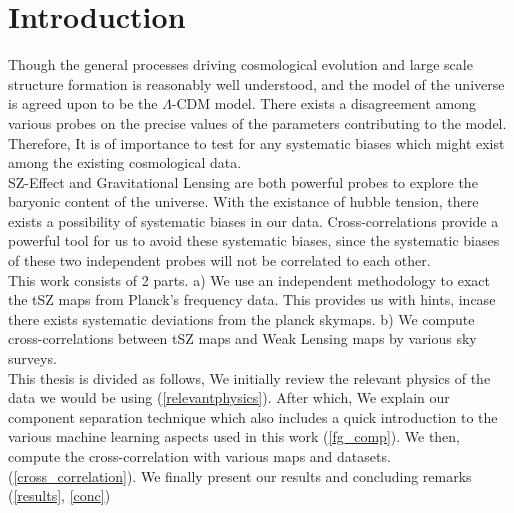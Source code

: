 \chapter{Introduction}
Though the general processes driving cosmological evolution and large scale structure formation is reasonably well understood,
and the model of the universe is agreed upon to be the $\Lambda$-CDM model.
There exists a disagreement among various probes on the precise values of the parameters contributing to the model. 
Therefore, It is of importance to test for any systematic biases which might exist among the existing cosmological data.
\\
SZ-Effect and Gravitational Lensing are both powerful probes to explore the baryonic content of the universe. With the existance of hubble tension, there exists
a possibility of systematic biases in our data. Cross-correlations provide a powerful tool for us to avoid these systematic biases, since the systematic biases
of these two independent probes will not be correlated to each other. 
\\
This work consists of 2 parts. a) We use an independent methodology to exact the tSZ maps from Planck's frequency data. This provides us with hints, incase
there exists systematic deviations from the planck skymaps. b) We compute cross-correlations between tSZ maps and Weak Lensing maps by various sky surveys.
\\
This thesis is divided as follows, We initially review the relevant physics of the data we would be using (\ref{relevantphysics}). After which, We explain our
component separation technique which also includes a quick introduction to the various machine learning aspects used in this work (\ref{fg_comp}). We then,
compute the cross-correlation with various maps and datasets. (\ref{cross_correlation}). We finally present our results and concluding remarks
(\ref{results}, \ref{conc})











